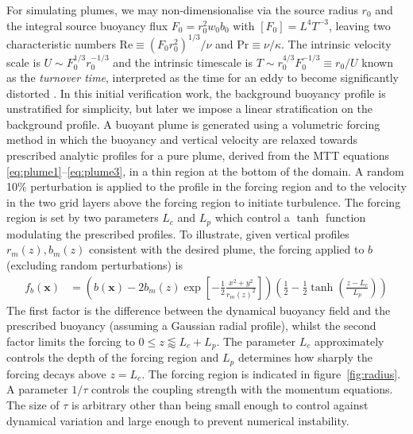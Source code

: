 \documentclass[a4paper]{article}
\begin{document}
For simulating plumes, we may non-dimensionalise via the source radius $r_0$ and the integral source buoyancy
flux $F_0 = r_0^2 w_0 b_0$ with $\left[F_0\right] = L^4 T^{-3}$, leaving two characteristic numbers
$\mathrm{Re} \equiv (F_0r_0^2)^{1/3}/\nu$ and $\mathrm{Pr} \equiv \nu /\kappa$. The intrinsic velocity scale
is $U \sim F_0^{1/3} r_0^{-1/3}$ and the intrinsic timescale is $T \sim r_0^{4/3} F_0^{-1/3} \equiv r_0/U$
known as the \emph{turnover time}, interpreted as the time for an eddy to become significantly distorted
\citep{frisch1995}. In this initial verification work, the background buoyancy profile is unstratified for
simplicity, but later we impose a linear stratification on the background profile. A buoyant plume is
generated using a volumetric forcing method in which the buoyancy and vertical velocity are relaxed towards
prescribed analytic profiles for a pure plume, derived from the MTT equations
\eqref{eq:plume1}--\eqref{eq:plume3}, in a thin region at the bottom of the domain. A random 10\% perturbation
is applied to the profile in the forcing region and to the velocity in the two grid layers above the forcing
region to initiate turbulence. The forcing region is set by two parameters $L_c$ and $L_p$ which control a
$\tanh$ function modulating the prescribed profiles. To illustrate, given vertical profiles $r_m(z), b_m(z)$
consistent with the desired plume, the forcing applied to $b$ (excluding random perturbations) is
\begin{align}
	f_b(\bm{x}) &= \left(b(\bm{x}) -
		2b_m(z)\exp\left[-\frac{1}{2}\frac{x^2+y^2}{r_m(z)^2}\right]\right)\left(\frac{1}{2}-\frac{1}{2}\tanh\left(\frac{z-L_c}{L_p}\right)\right)
\end{align}
The first factor is the difference between the dynamical buoyancy field and the prescribed buoyancy (assuming
a Gaussian radial profile), whilst the second factor limits the forcing to $0 \le z \lessapprox L_c + L_p$.
The parameter $L_c$ approximately controls the depth of the forcing region and $L_p$ determines how sharply
the forcing decays above $z=L_c$. The forcing region is indicated in figure~\ref{fig:radius}. A parameter
$1/\tau$ controls the coupling strength with the momentum equations. The size of $\tau$ is arbitrary other
than being small enough to control against dynamical variation and large enough to prevent numerical
instability.
\end{document}
